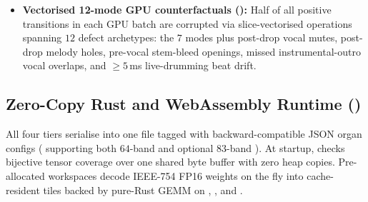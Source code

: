 \begin{itemize}
  \item \textbf{Vectorised 12-mode GPU counterfactuals ():} Half of all positive transitions in each GPU batch are corrupted via slice-vectorised operations spanning $12$ defect archetypes: the $7$  modes plus post-drop vocal mutes, post-drop melody holes, pre-vocal stem-bleed openings, missed instrumental-outro vocal overlaps, and $\ge 5$\,ms live-drumming beat drift.
\end{itemize}

\subsection{Zero-Copy Rust and WebAssembly Runtime ()}
\label{sec:runtime}

All four \sone{} tiers serialise into one  file tagged  with backward-compatible JSON organ configs ( supporting both $64$-band  and optional $83$-band ). At startup,  checks bijective tensor coverage over one shared byte buffer with zero heap copies. Pre-allocated workspaces decode IEEE-754 FP16 weights on the fly into cache-resident tiles backed by pure-Rust  GEMM on , , and .
